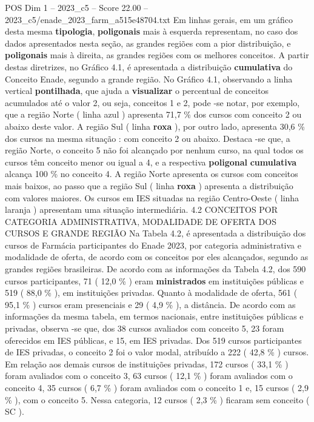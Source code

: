 \begin{textsample}{POS Dim 1 – 2023\_c5 – Score 22.00 – 2023\_c5/enade\_2023\_farm\_a515e48704.txt}
Em linhas gerais, em um gráfico desta mesma \textbf{tipologia}, \textbf{poligonais} mais à esquerda representam, no caso dos dados apresentados nesta seção, as grandes regiões com a pior distribuição, e \textbf{poligonais} mais à direita, as grandes regiões com os melhores conceitos.
A partir destas diretrizes, no Gráfico 4.1, é apresentada a distribuição \textbf{cumulativa} do Conceito Enade, segundo a grande região.
No Gráfico 4.1, observando a linha vertical \textbf{pontilhada}, que ajuda a \textbf{visualizar} o percentual de conceitos acumulados até o valor 2, ou seja, conceitos 1 e 2, pode -se notar, por exemplo, que a região Norte ( linha azul ) apresenta 71,7 \% dos cursos com conceito 2 ou abaixo deste valor.
A região Sul ( linha \textbf{roxa} ), por outro lado, apresenta 30,6 \% dos cursos na mesma situação : com conceito 2 ou abaixo.
Destaca -se que, a região Norte, o conceito 5 não foi alcançado por nenhum curso, na qual todos os cursos têm conceito menor ou igual a 4, e a respectiva \textbf{poligonal} \textbf{cumulativa} alcança 100 \% no conceito 4.
A região Norte apresenta os cursos com conceitos mais baixos, ao passo que a região Sul ( linha \textbf{roxa} ) apresenta a distribuição com valores maiores.
Os cursos em IES situadas na região Centro-Oeste ( linha laranja ) apresentam uma situação intermediária. 4.2 CONCEITOS POR CATEGORIA ADMINISTRATIVA, MODALIDADE DE OFERTA DOS CURSOS E GRANDE REGIÃO Na Tabela 4.2, é apresentada a distribuição dos cursos de Farmácia participantes do Enade 2023, por categoria administrativa e modalidade de oferta, de acordo com os conceitos por eles alcançados, segundo as grandes regiões brasileiras.
De acordo com as informações da Tabela 4.2, dos 590 cursos participantes, 71 ( 12,0 \% ) eram \textbf{ministrados} em instituições públicas e 519 ( 88,0 \% ), em instituições privadas.
Quanto à modalidade de oferta, 561 ( 95,1 \% ) cursos eram presenciais e 29 ( 4,9 \% ), a distância.
De acordo com as informações da mesma tabela, em termos nacionais, entre instituições públicas e privadas, observa -se que, dos 38 cursos avaliados com conceito 5, 23 foram oferecidos em IES públicas, e 15, em IES privadas.
Dos 519 cursos participantes de IES privadas, o conceito 2 foi o valor modal, atribuído a 222 ( 42,8 \% ) cursos.
Em relação aos demais cursos de instituições privadas, 172 cursos ( 33,1 \% ) foram avaliados com o conceito 3, 63 cursos ( 12,1 \% ) foram avaliados com o conceito 4, 35 cursos ( 6,7 \% ) foram avaliados com o conceito 1 e, 15 cursos ( 2,9 \% ), com o conceito 5.
Nessa categoria, 12 cursos ( 2,3 \% ) ficaram sem conceito ( SC ).

\end{textsample}
